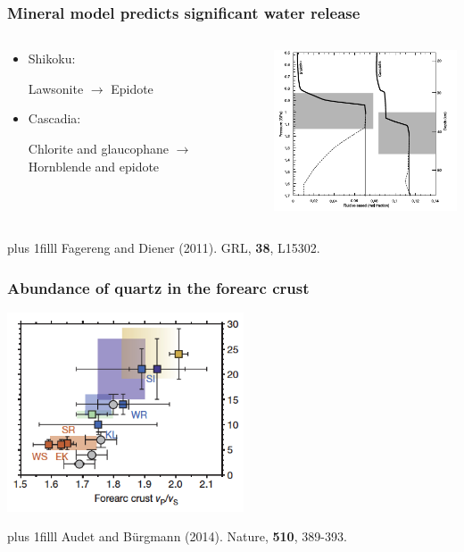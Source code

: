 \documentclass{beamer}
\newcommand{\btVFill}{\vskip0pt plus 1filll}
\begin{document}
	\begin{frame}
		\frametitle{Mineral model predicts significant water release}
		\begin{columns}[c]
		\begin{column}{5cm}
			\begin{itemize}
				\item Shikoku:

				Lawsonite $\rightarrow$ Epidote

				\vspace{2em}

				\item Cascadia:

				Chlorite and glaucophane $\rightarrow$ Hornblende and epidote
			\end{itemize}
		\end{column}
		\begin{column}{7cm}
			\begin{center}
				\includegraphics[trim={0cm 0cm 0cm 0cm}, clip, width=7cm]{articles/fagereng_diener_2011_2.png}
			\end{center}
		\end{column}
		\end{columns}
		\btVFill
		\tiny{Fagereng and Diener (2011). GRL, \textbf{38}, L15302.}
	\end{frame}

	\begin{frame}
		\frametitle{Abundance of quartz in the forearc crust}
		\begin{center}
			\includegraphics[trim={0cm 0cm 0cm 0cm}, clip, width=7cm]{articles/audet_burgmann_2014_1c.png}
		\end{center}
		\btVFill
		\tiny{Audet and B\"urgmann (2014). Nature, \textbf{510}, 389-393.}
	\end{frame}
\end{document}
